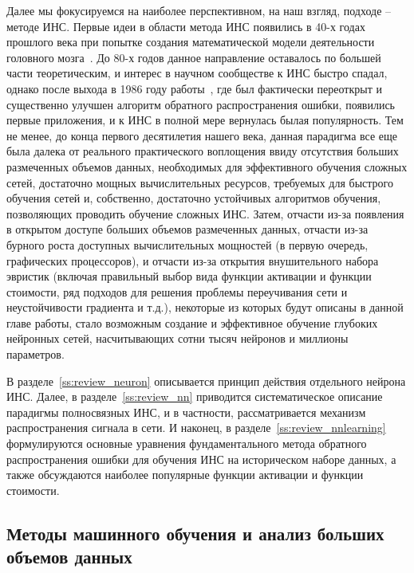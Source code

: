 \documentclass[a4paper,12pt,russian]{article} %
\begin{document}
Далее мы фокусируемся на наиболее перспективном, на наш взгляд, подходе -- методе ИНС.
Первые идеи в области метода ИНС появились в 40-х годах прошлого века при попытке создания математической модели деятельности головного мозга~\cite{mcculloch1943logical,vinner1948cybernetics,hebb1949organization}.
До 80-х годов данное направление оставалось по большей части теоретическим, и интерес в научном сообществе к ИНС быстро спадал, однако после выхода в 1986 году работы~\cite{williams1986learning}, где был фактически переоткрыт и существенно улучшен алгоритм обратного распространения ошибки, появились первые приложения, и к ИНС в полной мере вернулась былая популярность.
Тем не менее, до конца первого десятилетия нашего века, данная парадигма все еще была далека от реального практического воплощения ввиду отсутствия больших размеченных объемов данных, необходимых для эффективного обучения сложных сетей, достаточно мощных вычислительных ресурсов, требуемых для быстрого обучения сетей и, собственно, достаточно устойчивых алгоритмов обучения, позволяющих проводить обучение сложных ИНС.
Затем, отчасти из-за появления в открытом доступе больших объемов размеченных данных, отчасти из-за бурного роста доступных вычислительных мощностей (в первую очередь, графических процессоров), и отчасти из-за открытия внушительного набора эвристик (включая правильный выбор вида функции активации и функции стоимости, ряд подходов для решения проблемы переучивания сети и неустойчивости градиента и т.д.), некоторые из которых будут описаны в данной главе работы, стало возможным создание и эффективное обучение глубоких нейронных сетей, насчитывающих сотни тысяч нейронов и миллионы параметров.

В разделе~\ref{ss:review_neuron} описывается принцип действия отдельного нейрона ИНС.
Далее, в разделе~\ref{ss:review_nn} приводится систематическое описание парадигмы полносвязных ИНС, и в частности, рассматривается механизм распространения сигнала в сети.
И наконец, в разделе~\ref{ss:review_nnlearning} формулируются основные уравнения фундаментального метода обратного распространения ошибки для обучения ИНС на историческом наборе данных, а также обсуждаются наиболее популярные функции активации и  функции стоимости.

\newpage
\subsection{Методы машинного обучения и анализ больших объемов данных} \label{ss:review_methods}
\end{document}
